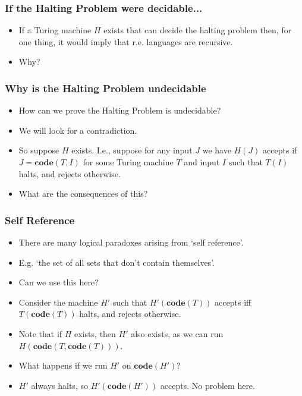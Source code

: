 \documentclass[handout]{beamer}
\newcommand{\co}{\mathbf{code}}
\begin{document}
\begin{frame}
\frametitle{If the Halting Problem were decidable...}
\begin{itemize}
\item If a Turing machine $H$ exists that can decide the halting problem then, for one thing, it would imply that r.e. languages are recursive. 
\vspace{1cm}
\item Why? 
\end{itemize}
\end{frame}

\begin{frame}
\frametitle{Why is the Halting Problem undecidable}
\begin{itemize}
\item How can we prove the Halting Problem is undecidable?
\vspace{0.2cm}
\item We will look for a contradiction.
\vspace{0.2cm}
\item So suppose $H$ exists. I.e., suppose for any input $J$ we have $H(J)$ accepts if $J=\co(T,I)$ for some Turing machine $T$ and input $I$ such that $T(I)$ halts, and rejects otherwise. 
\vspace{0.2cm}
\item What are the consequences of this?  
\end{itemize}
\end{frame}



\begin{frame}
\frametitle{Self Reference}
\begin{itemize}
\item There are many logical paradoxes arising from `self reference'.  
\vspace{0.2cm}
\item E.g. `the set of all sets that don't contain themselves'.
\vspace{0.2cm}
\item Can we use this here?
\vspace{0.2cm}
\item Consider the machine $H'$ such that $H'(\co(T))$ accepts iff $T(\co(T))$ halts, and rejects otherwise.
\vspace{0.2cm}
\item Note that if $H$ exists, then $H'$ also exists, as we can run $H(\co(T,\co(T)))$.
\vspace{0.2cm}
\item What happens if we run $H'$ on $\co(H')$?
\vspace{0.2cm}
\item $H'$ always halts, so $H'(\co(H'))$ accepts. No problem here. 
\end{itemize}
\end{frame}
\end{document}
